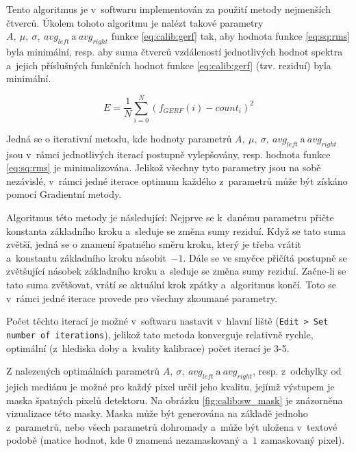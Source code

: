 Tento algoritmus je v~softwaru implementován za použití metody nejmenších čtverců. Úkolem tohoto algoritmu je nalézt takové parametry $A,~\mu,~\sigma,~avg_{left}~\text{a}~avg_{right}$ funkce \ref{eq:calib:gerf} tak, aby hodnota funkce \ref{eq:sq:rms} byla minimální, resp. aby suma čtverců vzdáleností jednotlivých hodnot spektra a~jejich příslušných funkčních hodnot funkce \ref{eq:calib:gerf} (tzv. reziduí) byla minimální.

\begin{equation}\label{eq:sq:rms}
	E = \frac{1}{N} \sum_{i=0}^{N}(f_{GERF}(i) - count_i)^2
\end{equation}

Jedná se o iterativní metodu, kde hodnoty parametrů $A,~\mu,~\sigma,~avg_{left}~\text{a}~avg_{right}$ jsou v~rámci jednotlivých iterací postupně vylepšovány, resp. hodnota funkce \ref{eq:sq:rms} je minimalizována. Jelikož všechny tyto parametry jsou na sobě nezávislé, v~rámci jedné iterace optimum každého z~parametrů může být získáno pomocí Gradientní metody.

Algoritmus této metody je následující: Nejprve se k~danému parametru přičte konstanta základního kroku a~sleduje se změna sumy reziduí. Když se tato suma zvětší, jedná se o znamení špatného směru kroku, který je třeba vrátit a~konstantu základního kroku násobit~$-1$. Dále se ve smyčce přičítá postupně se zvětšující násobek základního kroku a~sleduje se změna sumy reziduí. Začne-li se tato suma zvětšovat, vrátí se aktuální krok zpátky a~algoritmus končí. Toto se v~rámci jedné iterace provede pro všechny zkoumané parametry.

Počet těchto iterací je možné v~softwaru nastavit v~hlavní liště (\texttt{Edit > Set number of iterations}), jelikož tato metoda konverguje relativně rychle, optimální (z~hlediska doby a~kvality kalibrace) počet iterací je 3-5.

Z nalezených optimálních parametrů $A,~\sigma,~avg_{left}~\text{a}~avg_{right}$, resp. z~odchylky od jejich mediánu je možné pro každý pixel určil jeho kvalitu, jejímž výstupem je maska špatných pixelů detektoru. Na obrázku \ref{fig:calib:sw_mask} je znázorněna vizualizace této masky. Maska může být generována na základě jednoho z~parametrů, nebo všech parametrů dohromady a~může být uložena v~textové podobě (matice hodnot, kde $0$ znamená nezamaskovaný a~$1$ zamaskovaný pixel).

